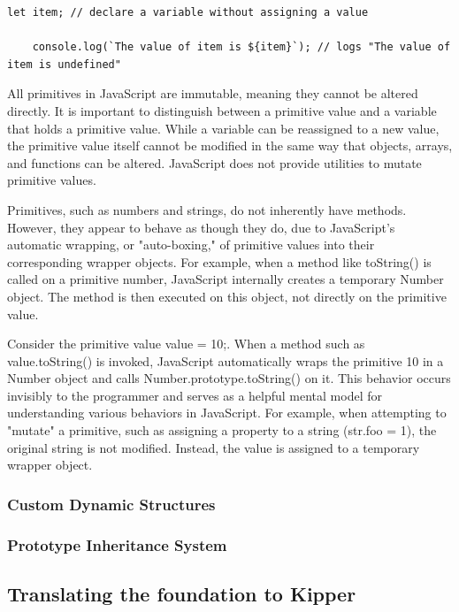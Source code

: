 \begin{lstlisting}[caption=typeof null return "object" in JavaScript ]
	let item; // declare a variable without assigning a value

	console.log(`The value of item is ${item}`); // logs "The value of item is undefined"
\end{lstlisting}

All primitives in JavaScript are immutable, meaning they cannot be altered directly. It is important to distinguish between a primitive value and a variable that holds a primitive value. While a variable can be reassigned to a new value, the primitive value itself cannot be modified in the same way that objects, arrays, and functions can be altered. JavaScript does not provide utilities to mutate primitive values.

Primitives, such as numbers and strings, do not inherently have methods. However, they appear to behave as though they do, due to JavaScript's automatic wrapping, or "auto-boxing," of primitive values into their corresponding wrapper objects. For example, when a method like toString() is called on a primitive number, JavaScript internally creates a temporary Number object. The method is then executed on this object, not directly on the primitive value.

Consider the primitive value value = 10;. When a method such as value.toString() is invoked, JavaScript automatically wraps the primitive 10 in a Number object and calls Number.prototype.toString() on it. This behavior occurs invisibly to the programmer and serves as a helpful mental model for understanding various behaviors in JavaScript. For example, when attempting to "mutate" a primitive, such as assigning a property to a string (str.foo = 1), the original string is not modified. Instead, the value is assigned to a temporary wrapper object.

\subsubsection{Custom Dynamic Structures}

\subsubsection{Prototype Inheritance System}

\subsection{Translating the foundation to Kipper}

